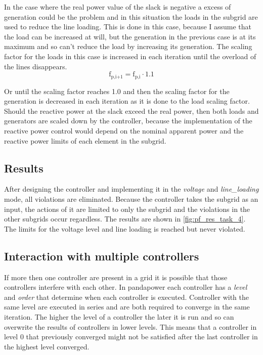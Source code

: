 \documentclass[conference]{IEEEtran}
\begin{document}
In the case where the real power value of the slack is negative a excess of generation could be the problem and in this situation the loads in the subgrid are used to reduce the line loading. This is done in this case, because I assume that the load can be increased at will, but the generation in the previous case is at its maximum and so can't reduce the load by increasing its generation. The scaling factor for the loads in this case is increased in each iteration until the overload of the lines disappears. 
\begin{equation}
	\text{f}_{\text{p,i+1}} = \text{f}_{\text{p,i}} \cdot 1.1
\end{equation}

Or until the scaling factor reaches 1.0 and then the scaling factor for the generation is decreased in each iteration as it is done to the load scaling factor. Should the reactive power at the slack exceed the real power, then both loads and generators are scaled down by the controller, because the implementation of the reactive power control would depend on the nominal apparent power and the reactive power limits of each element in the subgrid.
\subsection{Results}
After designing the controller and implementing it in the \textit{voltage} and \textit{line\_loading} mode, all violations are eliminated. Because the controller takes the subgrid as an input, the actions of it are limited to only the subgrid and the violations in the other subgrids occur regardless. The results are shown in \cref{fig:pf_res_task_4}. The limits for the voltage level and line loading is reached but never violated.
\subsection{Interaction with multiple controllers}
If more then one controller are present in a grid it is possible that those controllers interfere with each other. In pandapower each controller has a \textit{level} and \textit{order} that determine when each controller is executed. Controller with the same level are executed in series and are both required to converge in the same iteration. The higher the level of a controller the later it is run and so can overwrite the results of controllers in lower levels. This means that a controller in level 0 that previously converged might not be satisfied after the last controller in the highest level converged.
\end{document}
